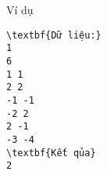 Ví dụ
\begin{verbatim}
\textbf{Dữ liệu:} 
1
6
1 1
2 2
-1 -1
-2 2
2 -1
-3 -4
\textbf{Kết qủa} 
2 
\end{verbatim}